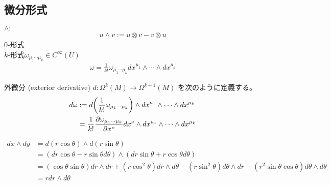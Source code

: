 \documentclass[uplatex,dvipdfmx,a4paper,11pt]{jlreq}
\theoremstyle{definition}
\begin{document}
\subsection{微分形式}
\begin{definition}[微分形式]
  $\land:$
  \begin{align}
    u\land v := u\otimes v - v\otimes u
  \end{align}
  $0$-形式 \\
  $k$-形式$\omega_{\mu_1\cdots\mu_k}\in C^\infty(U)$
  \begin{align}
    \omega = \frac{1}{k!}\omega_{\mu_1\cdots\mu_k}dx^{\mu_1}\land\cdots\land dx^{\mu_k}
  \end{align}
\end{definition}
\begin{definition}[外微分]
  外微分 (exterior derivative) $d: \Omega^k(M)\to\Omega^{k+1}(M)$ を次のように定義する。
  \begin{align}
    d\omega & := d\qty(\frac{1}{k!}\omega_{\mu_1\cdots\mu_k})\land dx^{\mu_1}\land\cdots\land dx^{\mu_k}                \\
            & = \frac{1}{k!}\pdv{\omega_{\mu_1\cdots\mu_k}}{x^{\nu}}dx^{\nu}\land dx^{\mu_1}\land\cdots\land dx^{\mu_k}
  \end{align}
\end{definition}
\begin{align}
  dx\land dy & = d(r\cos\theta)\land d(r\sin\theta)                                                                                                                  \\
             & = (dr\cos\theta - r\sin\theta d\theta)\land (dr\sin\theta + r\cos\theta d\theta)                                                                      \\
             & = (\cos\theta\sin\theta)dr\land dr + (r\cos^2\theta)dr\land d\theta - (r\sin^2\theta) d\theta\land dr - (r^2\sin\theta\cos\theta)d\theta\land d\theta \\
             & = r dr\land d\theta
\end{align}

\begin{definition}
\end{definition}

\begin{theorem}[ストークスの定理]
\end{theorem}

\begin{definition}[ド・ラームコホモロジー]
\end{definition}
\end{document}
